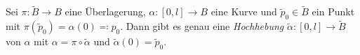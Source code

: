 Sei $\pi\colon \widetilde{B}\to B$ eine Überlagerung, \pause $\alpha\colon [0,l]\to B$ eine Kurve \pause und $\widetilde{p}_0\in\widetilde{B}$ ein Punkt mit $\pi(\widetilde{p}_0)=\alpha(0)\eqqcolon p_0$. \pause Dann gibt es genau eine \emph{Hochhebung} \pause $\widetilde{\alpha}\colon [0,l]\to\widetilde{B}$ von $\alpha$ \pause mit $ \alpha = \pi\circ \widetilde{\alpha}$ \pause und $\widetilde{\alpha}(0)=\widetilde{p}_0$.